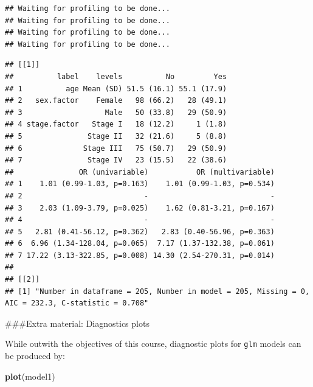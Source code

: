 \documentclass[]{book}
\makeatletter
\newenvironment{Shaded}{\begin{snugshade}}{\end{snugshade}}
\newcommand{\DataTypeTok}[1]{\textcolor[rgb]{0.13,0.29,0.53}{#1}}
\newcommand{\KeywordTok}[1]{\textcolor[rgb]{0.13,0.29,0.53}{\textbf{#1}}}
\newcommand{\NormalTok}[1]{#1}
\newcommand{\OperatorTok}[1]{\textcolor[rgb]{0.81,0.36,0.00}{\textbf{#1}}}
\newcommand{\OtherTok}[1]{\textcolor[rgb]{0.56,0.35,0.01}{#1}}
\newcommand{\StringTok}[1]{\textcolor[rgb]{0.31,0.60,0.02}{#1}}
\newenvironment{kframe}{%
\medskip{}
\setlength{\fboxsep}{.8em}
 \def\at@end@of@kframe{}%
 \ifinner\ifhmode%
  \def\at@end@of@kframe{\end{minipage}}%
  \begin{minipage}{\columnwidth}%
 \fi\fi%
 \def\FrameCommand##1{\hskip\@totalleftmargin \hskip-\fboxsep
 \colorbox{shadecolor}{##1}\hskip-\fboxsep
     \hskip-\linewidth \hskip-\@totalleftmargin \hskip\columnwidth}%
 \MakeFramed {\advance\hsize-\width
   \@totalleftmargin\z@ \linewidth\hsize
   \@setminipage}}%
 {\par\unskip\endMakeFramed%
 \at@end@of@kframe}
\renewenvironment{Shaded}{\begin{kframe}}{\end{kframe}}
\theoremstyle{definition}
\theoremstyle{definition}
\theoremstyle{definition}
\theoremstyle{remark}
\makeatother
\begin{document}
\begin{Shaded}
\end{Shaded}

\begin{verbatim}
## Waiting for profiling to be done...
## Waiting for profiling to be done...
## Waiting for profiling to be done...
## Waiting for profiling to be done...
\end{verbatim}

\begin{verbatim}
## [[1]]
##          label    levels          No         Yes
## 1          age Mean (SD) 51.5 (16.1) 55.1 (17.9)
## 2   sex.factor    Female   98 (66.2)   28 (49.1)
## 3                   Male   50 (33.8)   29 (50.9)
## 4 stage.factor   Stage I   18 (12.2)     1 (1.8)
## 5               Stage II   32 (21.6)     5 (8.8)
## 6              Stage III   75 (50.7)   29 (50.9)
## 7               Stage IV   23 (15.5)   22 (38.6)
##               OR (univariable)           OR (multivariable)
## 1    1.01 (0.99-1.03, p=0.163)    1.01 (0.99-1.03, p=0.534)
## 2                            -                            -
## 3    2.03 (1.09-3.79, p=0.025)    1.62 (0.81-3.21, p=0.167)
## 4                            -                            -
## 5   2.81 (0.41-56.12, p=0.362)   2.83 (0.40-56.96, p=0.363)
## 6  6.96 (1.34-128.04, p=0.065)  7.17 (1.37-132.38, p=0.061)
## 7 17.22 (3.13-322.85, p=0.008) 14.30 (2.54-270.31, p=0.014)
## 
## [[2]]
## [1] "Number in dataframe = 205, Number in model = 205, Missing = 0, AIC = 232.3, C-statistic = 0.708"
\end{verbatim}

\#\#\#Extra material: Diagnostics plots

While outwith the objectives of this course, diagnostic plots for
\texttt{glm} models can be produced by:

\begin{Shaded}
\begin{Highlighting}[]
\KeywordTok{plot}\NormalTok{(model1)}
\end{Highlighting}
\end{Shaded}
\end{document}
